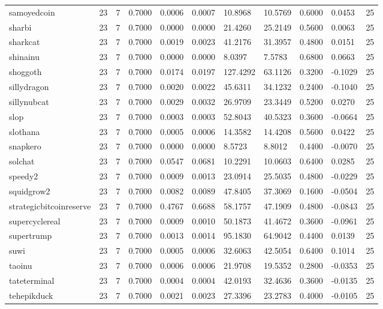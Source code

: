 \begin{table}[htbp]
\begin{tabular}{lllllllllll}
samoyedcoin & 23 & 7 & 0.7000 & 0.0006 & 0.0007 & 10.8968 & 10.5769 & 0.6000 & 0.0453 & 25 \\
sharbi & 23 & 7 & 0.7000 & 0.0000 & 0.0000 & 21.4260 & 25.2149 & 0.5600 & 0.0063 & 25 \\
sharkcat & 23 & 7 & 0.7000 & 0.0019 & 0.0023 & 41.2176 & 31.3957 & 0.4800 & 0.0151 & 25 \\
shinainu & 23 & 7 & 0.7000 & 0.0000 & 0.0000 & 8.0397 & 7.5783 & 0.6800 & 0.0663 & 25 \\
shoggoth & 23 & 7 & 0.7000 & 0.0174 & 0.0197 & 127.4292 & 63.1126 & 0.3200 & -0.1029 & 25 \\
sillydragon & 23 & 7 & 0.7000 & 0.0020 & 0.0022 & 45.6311 & 34.1232 & 0.2400 & -0.1040 & 25 \\
sillynubcat & 23 & 7 & 0.7000 & 0.0029 & 0.0032 & 26.9709 & 23.3449 & 0.5200 & 0.0270 & 25 \\
slop & 23 & 7 & 0.7000 & 0.0003 & 0.0003 & 52.8043 & 40.5323 & 0.3600 & -0.0664 & 25 \\
slothana & 23 & 7 & 0.7000 & 0.0005 & 0.0006 & 14.3582 & 14.4208 & 0.5600 & 0.0422 & 25 \\
snapkero & 23 & 7 & 0.7000 & 0.0000 & 0.0000 & 8.5723 & 8.8012 & 0.4400 & -0.0070 & 25 \\
solchat & 23 & 7 & 0.7000 & 0.0547 & 0.0681 & 10.2291 & 10.0603 & 0.6400 & 0.0285 & 25 \\
speedy2 & 23 & 7 & 0.7000 & 0.0009 & 0.0013 & 23.0914 & 25.5035 & 0.4800 & -0.0229 & 25 \\
squidgrow2 & 23 & 7 & 0.7000 & 0.0082 & 0.0089 & 47.8405 & 37.3069 & 0.1600 & -0.0504 & 25 \\
strategicbitcoinreserve & 23 & 7 & 0.7000 & 0.4767 & 0.6688 & 58.1757 & 47.1909 & 0.4800 & -0.0843 & 25 \\
supercyclereal & 23 & 7 & 0.7000 & 0.0009 & 0.0010 & 50.1873 & 41.4672 & 0.3600 & -0.0961 & 25 \\
supertrump & 23 & 7 & 0.7000 & 0.0013 & 0.0014 & 95.1830 & 64.9042 & 0.4400 & 0.0139 & 25 \\
suwi & 23 & 7 & 0.7000 & 0.0005 & 0.0006 & 32.6063 & 42.5054 & 0.6400 & 0.1014 & 25 \\
taoinu & 23 & 7 & 0.7000 & 0.0006 & 0.0006 & 21.9708 & 19.5352 & 0.2800 & -0.0353 & 25 \\
tateterminal & 23 & 7 & 0.7000 & 0.0004 & 0.0004 & 42.0193 & 32.4636 & 0.3600 & -0.0135 & 25 \\
tehepikduck & 23 & 7 & 0.7000 & 0.0021 & 0.0023 & 27.3396 & 23.2783 & 0.4000 & -0.0105 & 25 \\

\end{tabular}
\end{table}
